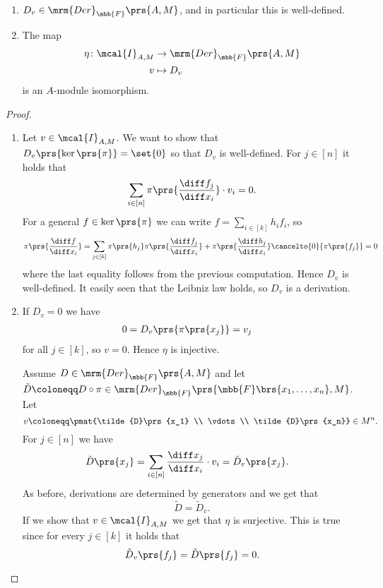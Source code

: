 \documentclass[10pt,a4paper,twoside,openany,hidelinks]{book}
\begin{document}
\begin{proposition}
\begin{enumerate}
\item $D_v \in \mrm{Der}_{\mbb{F}}\prs{A,M}$, and in particular this is well-defined.

\item The map
\begin{align*}
\eta \colon \mcal{I}_{A,M} &\to \mrm{Der}_{\mbb{F}}\prs{A,M} \\
v &\mapsto D_v
\end{align*}
is an $A$-module isomorphism.
\end{enumerate}
\end{proposition}

\begin{proof}
\begin{enumerate}
\item Let $v \in \mcal{I}_{A,M}$. We want to show that $D_v\prs{\ker\prs{\pi}} = \set{0}$ so that $D_v$ is well-defined.
For $j \in [n]$ it holds that
\[\sum_{i \in [n]} \pi\prs{\frac{\diff f_j}{\diff x_i}} \cdot v_i = 0 \text{.}\]
For a general $f \in \ker\prs{\pi}$ we can write $f = \sum_{i \in [k]} h_i f_i$, so
\begin{align*}
\pi\prs{\frac{\diff f}{\diff x_i}} = \sum_{j \in [k]} \pi\prs{h_j} \pi\prs{\frac{\diff f_j}{\diff x_i}} + \pi\prs{\frac{\diff h_j}{\diff x_i}} \cancelto{0}{\pi\prs{f_j}} = 0
\end{align*}
where the last equality follows from the previous computation. Hence $D_v$ is well-defined.
It easily seen that the Leibniz law holds, so $D_v$ is a derivation.

\item If $D_v = 0$ we have
\begin{align*}
0 &= D_v\prs{\pi\prs{x_j}} = v_j
\end{align*} 
for all $j \in [k]$, so $v = 0$. Hence $\eta$ is injective.

Assume $D \in \mrm{Der}_{\mbb{F}}\prs{A,M}$ and let $\tilde{D} \coloneqq D \circ \pi \in \mrm{Der}_{\mbb{F}}\prs{\mbb{F}\brs{x_1, \ldots, x_n}, M}$. Let
\[v \coloneqq \pmat{\tilde{D}\prs{x_1} \\ \vdots \\ \tilde{D}\prs{x_n}} \in M^n \text{.}\]
For $j \in [n]$ we have
\begin{align*}
\tilde{D}\prs{x_j} &= \sum_{i \in [n]} \frac{\diff x_j}{\diff x_i} \cdot v_i = \tilde{D}_v\prs{x_j} \text{.}
\end{align*}
As before, derivations are determined by generators and we get that
\[\tilde{D} = \tilde{D}_v \text{.}\]
If we show that $v \in \mcal{I}_{A,M}$ we get that $\eta$ is surjective.
This is true since for every $j \in [k]$ it holds that
\[\tilde{D}_v\prs{f_j} = \tilde{D}\prs{f_j} = 0 \text{.}\]
\end{enumerate}
\end{proof}
\end{document}
